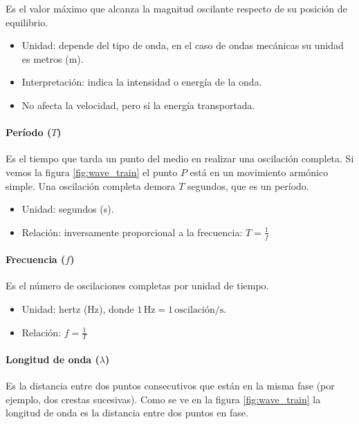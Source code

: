 Es el valor máximo que alcanza la magnitud oscilante respecto de su posición de equilibrio.

\begin{itemize}
  \item Unidad: depende del tipo de onda, en el caso de ondas mecánicas su unidad es metros (\(\si{\meter}\)).
  \item Interpretación: indica la intensidad o energía de la onda.
  \item No afecta la velocidad, pero sí la energía transportada.
\end{itemize}

\paragraph{Período (\(T\))}

Es el tiempo que tarda un punto del medio en realizar una oscilación completa. Si vemos la figura \ref{fig:wave_train} el punto \(P\) está en un movimiento armónico simple. Una oscilación completa demora \(T\) segundos, que es un período. 

\begin{itemize}
  \item Unidad: segundos (s).
  \item Relación: inversamente proporcional a la frecuencia: \(T = \frac{1}{f}\)
\end{itemize}

\paragraph{Frecuencia (\(f\))}

Es el número de oscilaciones completas por unidad de tiempo.

\begin{itemize}
  \item Unidad: hertz (Hz), donde \(1\, \text{Hz} = 1\, \text{oscilación/s}\).
  \item Relación: \(f = \frac{1}{T}\)
\end{itemize}

\paragraph{Longitud de onda (\(\lambda\))}

Es la distancia entre dos puntos consecutivos que están en la misma fase (por ejemplo, dos crestas sucesivas). Como se ve en la figura \ref{fig:wave_train} la longitud de onda es la distancia entre dos puntos en fase. 

